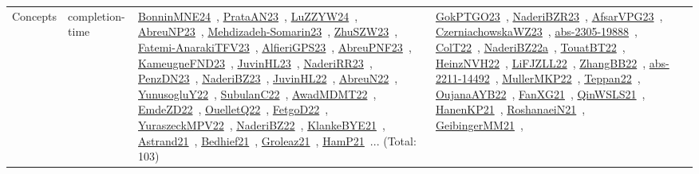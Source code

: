 {\begin{longtable}{lp{3cm}>{\raggedright\arraybackslash}p{6cm}>{\raggedright\arraybackslash}p{6cm}>{\raggedright\arraybackslash}p{8cm}}
Concepts & completion-time & \href{../works/BonninMNE24.pdf}{BonninMNE24}~\cite{BonninMNE24}, \href{../works/PrataAN23.pdf}{PrataAN23}~\cite{PrataAN23}, \href{../works/LuZZYW24.pdf}{LuZZYW24}~\cite{LuZZYW24}, \href{../works/AbreuNP23.pdf}{AbreuNP23}~\cite{AbreuNP23}, \href{../works/Mehdizadeh-Somarin23.pdf}{Mehdizadeh-Somarin23}~\cite{Mehdizadeh-Somarin23}, \href{../works/ZhuSZW23.pdf}{ZhuSZW23}~\cite{ZhuSZW23}, \href{../works/Fatemi-AnarakiTFV23.pdf}{Fatemi-AnarakiTFV23}~\cite{Fatemi-AnarakiTFV23}, \href{../works/AlfieriGPS23.pdf}{AlfieriGPS23}~\cite{AlfieriGPS23}, \href{../works/AbreuPNF23.pdf}{AbreuPNF23}~\cite{AbreuPNF23}, \href{../works/KameugneFND23.pdf}{KameugneFND23}~\cite{KameugneFND23}, \href{../works/JuvinHL23.pdf}{JuvinHL23}~\cite{JuvinHL23}, \href{../works/NaderiRR23.pdf}{NaderiRR23}~\cite{NaderiRR23}, \href{../works/PenzDN23.pdf}{PenzDN23}~\cite{PenzDN23}, \href{../works/NaderiBZ23.pdf}{NaderiBZ23}~\cite{NaderiBZ23}, \href{../works/JuvinHL22.pdf}{JuvinHL22}~\cite{JuvinHL22}, \href{../works/AbreuN22.pdf}{AbreuN22}~\cite{AbreuN22}, \href{../works/YunusogluY22.pdf}{YunusogluY22}~\cite{YunusogluY22}, \href{../works/SubulanC22.pdf}{SubulanC22}~\cite{SubulanC22}, \href{../works/AwadMDMT22.pdf}{AwadMDMT22}~\cite{AwadMDMT22}, \href{../works/EmdeZD22.pdf}{EmdeZD22}~\cite{EmdeZD22}, \href{../works/OuelletQ22.pdf}{OuelletQ22}~\cite{OuelletQ22}, \href{../works/FetgoD22.pdf}{FetgoD22}~\cite{FetgoD22}, \href{../works/YuraszeckMPV22.pdf}{YuraszeckMPV22}~\cite{YuraszeckMPV22}, \href{../works/NaderiBZ22.pdf}{NaderiBZ22}~\cite{NaderiBZ22}, \href{../works/KlankeBYE21.pdf}{KlankeBYE21}~\cite{KlankeBYE21}, \href{../works/Astrand21.pdf}{Astrand21}~\cite{Astrand21}, \href{../works/Bedhief21.pdf}{Bedhief21}~\cite{Bedhief21}, \href{../works/Groleaz21.pdf}{Groleaz21}~\cite{Groleaz21}, \href{../works/HamP21.pdf}{HamP21}~\cite{HamP21}... (Total: 103) & \href{../works/GokPTGO23.pdf}{GokPTGO23}~\cite{GokPTGO23}, \href{../works/NaderiBZR23.pdf}{NaderiBZR23}~\cite{NaderiBZR23}, \href{../works/AfsarVPG23.pdf}{AfsarVPG23}~\cite{AfsarVPG23}, \href{../works/CzerniachowskaWZ23.pdf}{CzerniachowskaWZ23}~\cite{CzerniachowskaWZ23}, \href{../works/abs-2305-19888.pdf}{abs-2305-19888}~\cite{abs-2305-19888}, \href{../works/ColT22.pdf}{ColT22}~\cite{ColT22}, \href{../works/NaderiBZ22a.pdf}{NaderiBZ22a}~\cite{NaderiBZ22a}, \href{../works/TouatBT22.pdf}{TouatBT22}~\cite{TouatBT22}, \href{../works/HeinzNVH22.pdf}{HeinzNVH22}~\cite{HeinzNVH22}, \href{../works/LiFJZLL22.pdf}{LiFJZLL22}~\cite{LiFJZLL22}, \href{../works/ZhangBB22.pdf}{ZhangBB22}~\cite{ZhangBB22}, \href{../works/abs-2211-14492.pdf}{abs-2211-14492}~\cite{abs-2211-14492}, \href{../works/MullerMKP22.pdf}{MullerMKP22}~\cite{MullerMKP22}, \href{../works/Teppan22.pdf}{Teppan22}~\cite{Teppan22}, \href{../works/OujanaAYB22.pdf}{OujanaAYB22}~\cite{OujanaAYB22}, \href{../works/FanXG21.pdf}{FanXG21}~\cite{FanXG21}, \href{../works/QinWSLS21.pdf}{QinWSLS21}~\cite{QinWSLS21}, \href{../works/HanenKP21.pdf}{HanenKP21}~\cite{HanenKP21}, \href{../works/RoshanaeiN21.pdf}{RoshanaeiN21}~\cite{RoshanaeiN21}, \href{../works/GeibingerMM21.pdf}{GeibingerMM21}~\cite{GeibingerMM21}, 
\end{longtable}}
